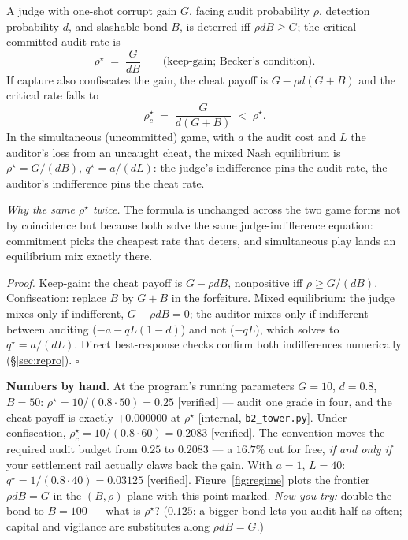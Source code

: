 \documentclass[11pt,a4paper]{article}
\begin{document}
\begin{thebox}
\begin{theorem}\label{thm:stage}
A judge with one-shot corrupt gain $G$, facing audit probability $\rho$, detection probability $d$, and slashable bond $B$, is deterred iff $\rho d B \ge G$; the critical committed audit rate is
\[ \rho^\star \;=\; \frac{G}{dB} \qquad \text{(keep-gain; Becker's condition).} \]
If capture also confiscates the gain, the cheat payoff is $G - \rho d (G{+}B)$ and the critical rate falls to
\[ \rho^\star_c \;=\; \frac{G}{d(G+B)} \;<\; \rho^\star. \]
In the simultaneous (uncommitted) game, with $a$ the audit cost and $L$ the auditor's loss from an uncaught cheat, the mixed Nash equilibrium is $\rho^\star = G/(dB)$, $q^\star = a/(dL)$: the judge's indifference pins the audit rate, the auditor's indifference pins the cheat rate.
\end{theorem}
\end{thebox}

\emph{Why the same $\rho^\star$ twice.} The formula is unchanged across the two game forms not by coincidence but because both solve the same judge-indifference equation: commitment picks the cheapest rate that deters, and simultaneous play lands an equilibrium mix exactly there.

\emph{Proof.} Keep-gain: the cheat payoff is $G - \rho d B$, nonpositive iff $\rho \ge G/(dB)$. Confiscation: replace $B$ by $G+B$ in the forfeiture. Mixed equilibrium: the judge mixes only if indifferent, $G - \rho d B = 0$; the auditor mixes only if indifferent between auditing ($-a - qL(1-d)$) and not ($-qL$), which solves to $q^\star = a/(dL)$. Direct best-response checks confirm both indifferences numerically (\S\ref{sec:repro}). \hfill$\square$

\textbf{Numbers by hand.} At the program's running parameters $G{=}10$, $d{=}0.8$, $B{=}50$: $\rho^\star = 10/(0.8\cdot 50) = 0.25$ [verified] --- audit one grade in four, and the cheat payoff is exactly $+0.000000$ at $\rho^\star$ [internal, \texttt{b2\_tower.py}]. Under confiscation, $\rho^\star_c = 10/(0.8\cdot 60) = 0.2083$ [verified]. The convention moves the required audit budget from $0.25$ to $0.2083$ --- a $16.7\%$ cut for free, \emph{if and only if} your settlement rail actually claws back the gain. With $a{=}1$, $L{=}40$: $q^\star = 1/(0.8\cdot 40) = 0.03125$ [verified]. Figure~\ref{fig:regime} plots the frontier $\rho d B = G$ in the $(B,\rho)$ plane with this point marked. \emph{Now you try:} double the bond to $B{=}100$ --- what is $\rho^\star$? ($0.125$: a bigger bond lets you audit half as often; capital and vigilance are substitutes along $\rho d B = G$.)
\end{document}
